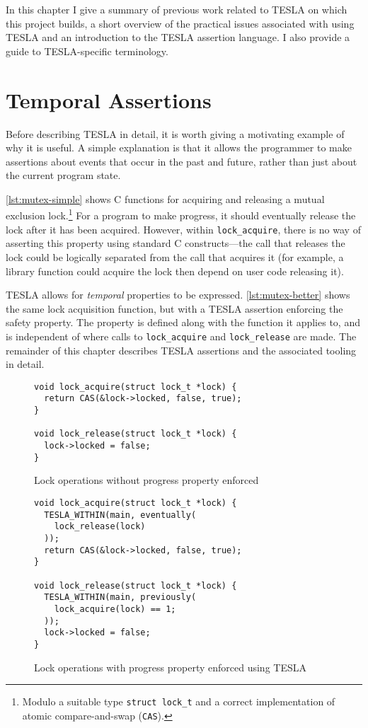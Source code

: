 In this chapter I give a summary of previous work related to TESLA on which this
project builds, a short overview of the practical issues associated with using
TESLA and an introduction to the TESLA assertion language. I also provide a
guide to TESLA-specific terminology.

\section{Temporal Assertions}

Before describing TESLA in detail, it is worth giving a motivating example of
why it is useful. A simple explanation is that it allows the programmer to make
assertions about events that occur in the past and future, rather than just
about the current program state.

\autoref{lst:mutex-simple} shows C functions for acquiring and releasing
a mutual exclusion lock.\footnote{Modulo a suitable type
\texttt{struct lock_t} and a correct implementation of atomic
compare-and-swap (\texttt{CAS}).} For a program to make progress,
it should eventually release the lock after it has been acquired.
However, within \texttt{lock_acquire}, there is no way of
asserting this property using standard C constructs---the call that
releases the lock could be logically separated from the call that
acquires it (for example, a library function could acquire the lock then
depend on user code releasing it).

TESLA allows for \emph{temporal} properties to be expressed.
\autoref{lst:mutex-better} shows the same lock acquisition function, but with a
TESLA assertion enforcing the safety property. The property is defined along
with the function it applies to, and is independent of where calls to
\texttt{lock_acquire} and \texttt{lock_release} are made. The
remainder of this chapter describes TESLA assertions and the associated tooling
in detail.

\begin{figure}
  \begin{verbatim}
void lock_acquire(struct lock_t *lock) {
  return CAS(&lock->locked, false, true);
}

void lock_release(struct lock_t *lock) {
  lock->locked = false;
}
  \end{verbatim}
  \caption{Lock operations without progress property enforced}
  \label{lst:mutex-simple}
\end{figure}

\begin{figure}
  \begin{verbatim}
void lock_acquire(struct lock_t *lock) {
  TESLA_WITHIN(main, eventually(
    lock_release(lock)
  ));
  return CAS(&lock->locked, false, true);
}

void lock_release(struct lock_t *lock) {
  TESLA_WITHIN(main, previously(
    lock_acquire(lock) == 1;
  ));
  lock->locked = false;
}
  \end{verbatim}
  \caption{Lock operations with progress property enforced using TESLA}
  \label{lst:mutex-better}
\end{figure}

